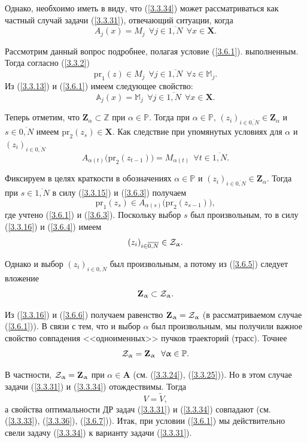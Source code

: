 \documentclass[11pt,twoside,openany]{report}
\newcommand{\bfn}{\begin{equation}}
\newcommand{\efn}{\end{equation}}
\newcommand{\ov}{\overline}
\newcommand{\al}{\alpha}
\newcommand{\su}{\subset}
\newcommand{\fa}{\forall}
\newcommand{\cz}{{\cal Z}}
\newcommand{\bba}{{\mathbb A}}
\newcommand{\bbz}{{\mathbb Z}}
\newcommand{\bbm}{{\mathbb M}}
\newcommand{\bbp}{{\mathbb P}}
\begin{document}
{Однако, необхоимо иметь в виду,
что (\ref{3.3.34}) может рассматриваться как частный
случай задачи (\ref{3.3.31}),
отвечающий ситуации, когда
\bfn
  \label{3.6.1}
  A_j(x) = M_j\ \ \fa j\in \ov{1,N}\ \ \fa x\in \mathbf{X}
  .
\efn

Рассмотрим данный вопрос подробнее,
полагая условие
(\ref{3.6.1}).
выполненным.
Тогда согласно (\ref{3.3.2})
\bfn
  \label{3.6.1`}
  \mathrm{pr}_1(z) \in M_j\ \ \fa j\in\ov{1,N}\ \ \fa z\in \bbm_j
  .
\efn
Из (\ref{3.3.13}) и (\ref{3.6.1})
имеем следующее свойство:
\bfn
  \label{3.6.2}
  \bba_j(x) = \bbm_j\ \ \fa j\in \ov{1,N}\ \ \fa x\in \mathbf{X}
  .
\efn

Теперь отметим, что
$\mathbf{Z}_\al\su \bbz$
при $\al\in\bbp.$
Тогда при
$\al\in \bbp,\, (z_i)_{i\in\ov{0,N}}\in \mathbf{Z}_\al$
и $s\in \ov{0,N}$  имеем
$\mathrm{pr}_2(z_s)\in \mathbf{X}.$
Как следствие при упомянутых условиях для
$\al$ и $(z_i)_{i\in\ov{0,N}}$
\bfn
  \label{3.6.3}
  A_{\al(t)}\bigl(\mathrm{pr}_2(z_{t-1})\bigl) = M_{\al(t)}\ \
  \fa t\in \ov{1,N}
  .
\efn

Фиксируем в целях краткости в обозначениях
$\al\in \bbp$
и $(z_i)_{i\in\ov{0,N}}\in \mathbf{Z}_\al.$
Тогда при
$s\in \ov{1,N}$
в силу (\ref{3.3.15}) и (\ref{3.6.3})
получаем
\bfn
  \label{3.6.4}
  \mathrm{pr}_1(z_s) \in A_{\al(s)}\bigl(\mathrm{pr}_2(z_{s-1})\bigl)
  ,
\efn
где учтено (\ref{3.6.1}) и (\ref{3.6.3}).
Поскольку выбор $s$ был произвольным,
то в силу (\ref{3.3.16}) и (\ref{3.6.4})
имеем
\bfn
  \label{3.6.5}
  (z_i)_{i\in\ov{0,N}}\in \cz_\al
  .
\efn

Однако и выбор
$(z_i)_{i\in\ov{0,N}}$
был произвольным, а потому из
(\ref{3.6.5}) следует вложение
\bfn
  \label{3.6.6}
  \mathbf{Z}_\al\su \cz_\al
  .
\efn

Из (\ref{3.3.16}) и (\ref{3.6.6})
получаем равенство
$\mathbf{Z}_\al = \cz_\al$
(в рассматриваемом случае (\ref{3.6.1})).
В связи с тем, что
и выбор $\al$ был произвольным,
мы получили  важное свойство совпадения
<<одноименных>> пучков траекторий (трасс).
Точнее
\bfn
  \label{3.6.7}
  \cz_\al = \mathbf{Z}_\al\ \ \fa \al\in \bbp
  .
\efn

В частности,
$\cz_\al = \mathbf{Z}_\al$ при $\al\in \mathbf{A}$
(см. (\ref{3.3.24}), (\ref{3.3.25})).
Но в этом случае задачи (\ref{3.3.31}) и
(\ref{3.3.34}) отождествимы.
Тогда
\bfn
  \label{3.6.8}
  V = \widetilde{V}
  ,
\efn
а свойства оптимальности ДР задач
(\ref{3.3.31}) и (\ref{3.3.34}) совпадают
(см. (\ref{3.3.33}), (\ref{3.3.36}), (\ref{3.6.7})).
Итак, при условии
(\ref{3.6.1})
мы действительно свели задачу (\ref{3.3.34}) к варианту задачи
(\ref{3.3.31}).

}
\end{document}
